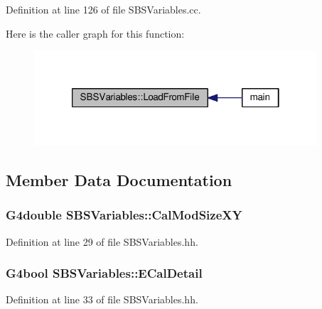 Definition at line 126 of file S\-B\-S\-Variables.\-cc.



Here is the caller graph for this function\-:\nopagebreak
\begin{figure}[H]
\begin{center}
\leavevmode
\includegraphics[width=298pt]{class_s_b_s_variables_a2d26940b705eab7e5a0eb11d4ff28dd5_icgraph}
\end{center}
\end{figure}




\subsection{Member Data Documentation}
\hypertarget{class_s_b_s_variables_a92e4bb3f201e0cff282ca71215348156}{
\subsubsection[{Cal\-Mod\-Size\-X\-Y}]{\setlength{\rightskip}{0pt plus 5cm}G4double S\-B\-S\-Variables\-::\-Cal\-Mod\-Size\-X\-Y}}\label{class_s_b_s_variables_a92e4bb3f201e0cff282ca71215348156}


Definition at line 29 of file S\-B\-S\-Variables.\-hh.

\hypertarget{class_s_b_s_variables_a370739e528c9193ac1da6d4fed91c882}{
\subsubsection[{E\-Cal\-Detail}]{\setlength{\rightskip}{0pt plus 5cm}G4bool S\-B\-S\-Variables\-::\-E\-Cal\-Detail}}\label{class_s_b_s_variables_a370739e528c9193ac1da6d4fed91c882}


Definition at line 33 of file S\-B\-S\-Variables.\-hh.

